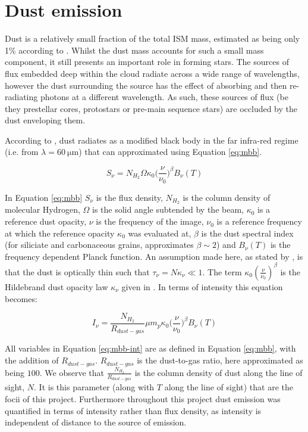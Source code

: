 \documentclass{report}
\begin{document}
\section{Dust emission}
Dust is a relatively small fraction of the total ISM mass, estimated as being only 1\% according to \textcite{noise}. Whilst the dust mass accounts for such a small mass component, it still presents an important role in forming stars. The sources of flux embedded deep within the cloud radiate across a wide range of wavelengths, however the dust surrounding the source has the effect of absorbing and then re-radiating photons at a different wavelength. As such, these sources of flux (be they prestellar cores, protostars or pre-main sequence stars) are occluded by the dust enveloping them.

According to \textcite{dustopacity}, dust radiates as a modified black body in the far infra-red regime (i.e. from $\lambda=\SI{60}{\micro\meter}$) that can approximated using Equation \ref{eq:mbb}.

\begin{equation} \label{eq:mbb}
  S_{\nu} = N_{H_{2}} \Omega \kappa_{0} \Big(\frac{\nu}{\nu_{0}}\Big)^{\beta} B_{\nu}(T)
\end{equation}

In Equation \ref{eq:mbb} $S_{\nu}$ is the flux density, $N_{H_{2}}$ is the column density of molecular Hydrogen, $\Omega$ is the solid angle subtended by the beam, $\kappa_{0}$ is a reference dust opacity, $\nu$ is the frequency of the image, $\nu_{0}$ is a reference frequency at which the reference opacity $\kappa_{0}$ was evaluated at, $\beta$ is the dust spectral index (for siliciate and carbonaceous grains, \textcite{beta} approximates $\beta \sim 2$) and $B_{\nu}(T)$ is the frequency dependent Planck function. An assumption made here, as stated by \textcite{kelly}, is that the dust is optically thin such that
$\tau_{\nu} = N\kappa_{\nu} \ll 1$. The term $\kappa_{0}(\frac{\nu}{\nu_{0}})^{\beta}$ is the Hildebrand dust opacity law $\kappa_{\nu}$ given in \textcite{dustopacity}. In terms of intensity this equation becomes:

\begin{equation} \label{eq:mbb-int}
  I_{\nu} = \frac{N_{H_{2}}}{R_{dust-gas}} \mu m_{p} \kappa_{0} \Big(\frac{\nu}{\nu_{0}}\Big)^{\beta} B_{\nu}(T)
\end{equation}

All variables in Equation \ref{eq:mbb-int} are as defined in Equation \ref{eq:mbb}, with the addition of $R_{dust-gas}$. $R_{dust-gas}$ is the dust-to-gas ratio, here approximated as being $100$. We observe that $\frac{N_{H_{2}}}{R_{dust-gas}}$ is the column density of dust along the line of sight, $N$. It is this parameter (along with $T$ along the line of sight) that are the focii of this project. Furthermore throughout this project dust emission was quantified in terms of intensity rather than flux density, as intensity is independent of distance to the source of emission.
\end{document}
